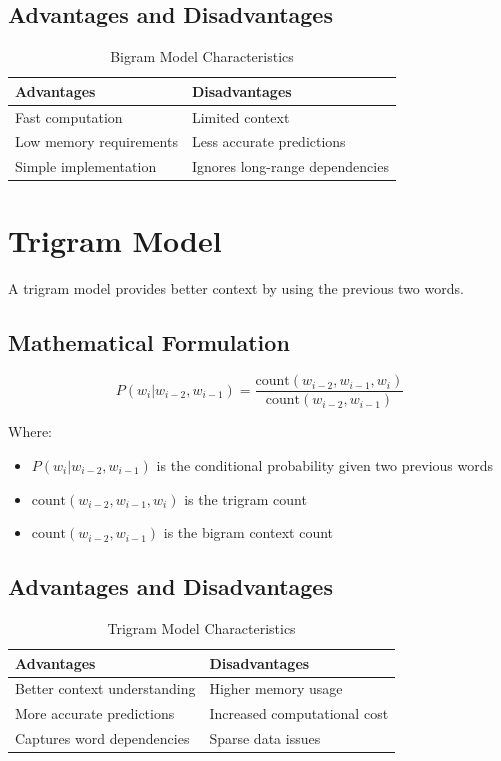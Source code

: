 \documentclass[12pt,a4paper]{report}
\begin{document}
\subsection{Advantages and Disadvantages}

\begin{table}[H]
\centering
\begin{tabular}{|l|l|}
\hline
\textbf{Advantages} & \textbf{Disadvantages} \\
\hline
Fast computation & Limited context \\
Low memory requirements & Less accurate predictions \\
Simple implementation & Ignores long-range dependencies \\
\hline
\end{tabular}
\caption{Bigram Model Characteristics}
\end{table}

\section{Trigram Model}

A trigram model provides better context by using the previous two words.

\subsection{Mathematical Formulation}

\begin{equation}
P(w_i | w_{i-2}, w_{i-1}) = \frac{\text{count}(w_{i-2}, w_{i-1}, w_i)}{\text{count}(w_{i-2}, w_{i-1})}
\end{equation}

Where:
\begin{itemize}
    \item $P(w_i | w_{i-2}, w_{i-1})$ is the conditional probability given two previous words
    \item $\text{count}(w_{i-2}, w_{i-1}, w_i)$ is the trigram count
    \item $\text{count}(w_{i-2}, w_{i-1})$ is the bigram context count
\end{itemize}

\subsection{Advantages and Disadvantages}

\begin{table}[H]
\centering
\begin{tabular}{|l|l|}
\hline
\textbf{Advantages} & \textbf{Disadvantages} \\
\hline
Better context understanding & Higher memory usage \\
More accurate predictions & Increased computational cost \\
Captures word dependencies & Sparse data issues \\
\hline
\end{tabular}
\caption{Trigram Model Characteristics}
\end{table}
\end{document}
